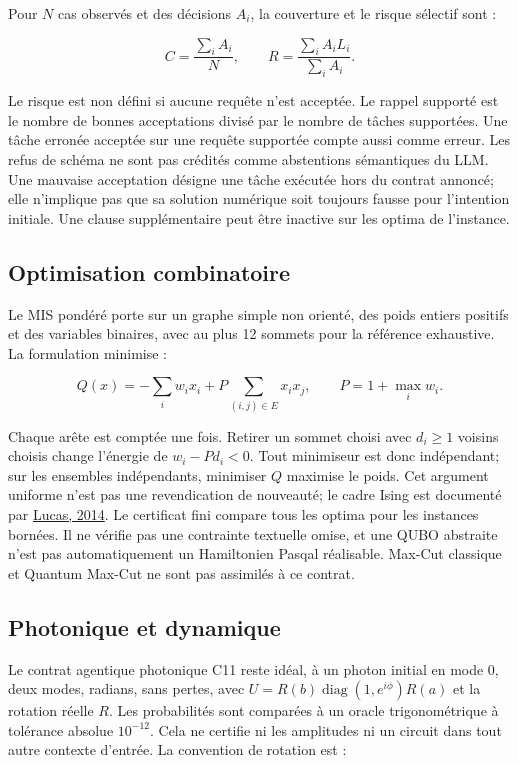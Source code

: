 \documentclass[11pt]{article}
\begin{document}
Pour $N$ cas observés et des décisions $A_i$, la couverture et le risque sélectif sont :

\[C=\frac{\sum_i A_i}{N},\qquad R=\frac{\sum_i A_i L_i}{\sum_i A_i}.\]

Le risque est non défini si aucune requête n'est acceptée. Le rappel supporté est le nombre de bonnes acceptations divisé par le nombre de tâches supportées. Une tâche erronée acceptée sur une requête supportée compte aussi comme erreur. Les refus de schéma ne sont pas crédités comme abstentions sémantiques du LLM. Une mauvaise acceptation désigne une tâche exécutée hors du contrat annoncé; elle n'implique pas que sa solution numérique soit toujours fausse pour l'intention initiale. Une clause supplémentaire peut être inactive sur les optima de l'instance.

\subsection{Optimisation combinatoire}

Le MIS pondéré porte sur un graphe simple non orienté, des poids entiers positifs et des variables binaires, avec au plus 12 sommets pour la référence exhaustive. La formulation minimise :

\[Q(x)=-\sum_i w_i x_i+P\sum_{(i,j)\in E}x_i x_j,\qquad P=1+\max_i w_i.\]

Chaque arête est comptée une fois. Retirer un sommet choisi avec $d_i\geq1$ voisins choisis change l'énergie de $w_i-Pd_i<0$. Tout minimiseur est donc indépendant; sur les ensembles indépendants, minimiser $Q$ maximise le poids. Cet argument uniforme n'est pas une revendication de nouveauté; le cadre Ising est documenté par \href{\detokenize{https://doi.org/10.3389/fphy.2014.00005}}{Lucas, 2014}. Le certificat fini compare tous les optima pour les instances bornées. Il ne vérifie pas une contrainte textuelle omise, et une QUBO abstraite n'est pas automatiquement un Hamiltonien Pasqal réalisable. Max-Cut classique et Quantum Max-Cut ne sont pas assimilés à ce contrat.

\subsection{Photonique et dynamique}

Le contrat agentique photonique C11 reste idéal, à un photon initial en mode 0, deux modes, radians, sans pertes, avec $U=R(b)\operatorname{diag}(1,e^{i\phi})R(a)$ et la rotation réelle $R$. Les probabilités sont comparées à un oracle trigonométrique à tolérance absolue $10^{-12}$. Cela ne certifie ni les amplitudes ni un circuit dans tout autre contexte d'entrée. La convention de rotation est :
\end{document}
